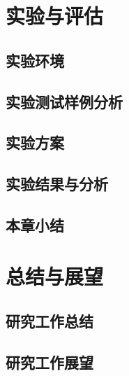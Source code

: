 
\cleardoublepage
\section{实验与评估}        %
\subsection{实验环境}
\subsection{实验测试样例分析}
\subsection{实验方案}
\subsection{实验结果与分析}
\subsection{本章小结}
\cleardoublepage
\section{总结与展望}        %
\subsection{研究工作总结}
\subsection{研究工作展望}
